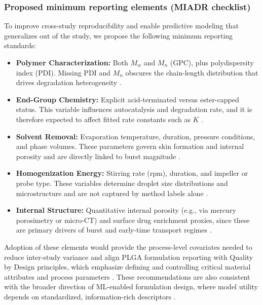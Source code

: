 \documentclass[preprint,12pt,authoryear]{elsarticle}
\begin{document}
\subsubsection{Proposed minimum reporting elements (MIADR checklist)}
To improve cross-study reproducibility and enable predictive modeling that generalizes out of the study, we propose the following minimum reporting standards:
\begin{itemize}
\item \textbf{Polymer Characterization:} Both $M_w$ and $M_n$ (GPC), plus polydispersity index (PDI). Missing PDI and $M_n$ obscures the chain-length distribution that drives degradation heterogeneity \citep{AndersonShive1997PLGABiodeg, Fredenberg2011}.
\item \textbf{End-Group Chemistry:} Explicit acid-terminated versus ester-capped status. This variable influences autocatalysis and degradation rate, and it is therefore expected to affect fitted rate constants such as $K$ \citep{MakadiaSiegel2011, Fredenberg2011}.
\item \textbf{Solvent Removal:} Evaporation temperature, duration, pressure conditions, and phase volumes. These parameters govern skin formation and internal porosity and are directly linked to burst magnitude \citep{Yoo2020Burst, KloseSiepmann2006Porosity}.
\item \textbf{Homogenization Energy:} Stirring rate (rpm), duration, and impeller or probe type. These variables determine droplet size distributions and microstructure and are not captured by method labels alone \citep{Jain2000, Fredenberg2011}.
\item \textbf{Internal Structure:} Quantitative internal porosity (e.g., via mercury porosimetry or micro-CT) and surface drug enrichment proxies, since these are primary drivers of burst and early-time transport regimes \citep{KloseSiepmann2006Porosity, Yoo2020Burst}.
\end{itemize}

Adoption of these elements would provide the process-level covariates needed to reduce inter-study variance and align PLGA formulation reporting with Quality by Design principles, which emphasize defining and controlling critical material attributes and process parameters \citep{ICHQ8R2}. These recommendations are also consistent with the broader direction of ML-enabled formulation design, where model utility depends on standardized, information-rich descriptors \citep{Bannigan2021, Bannigan2023LAI, Bao2025IJP}.
\end{document}
